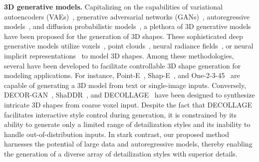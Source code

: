 \noindent\textbf{3D generative models.}
Capitalizing on the capabilities of variational autoencoders (VAEs)~\cite{vae,vqvae}, generative adversarial networks (GANs)~\cite{gan}, autoregressive models~\cite{pixelcnn,pixelcnnplus}, and diffusion probabilistic models~\cite{diffusion,DBLP:conf/icml/Sohl-DicksteinW15,DBLP:conf/iclr/0011SKKEP21}, a plethora of 3D generative models have been proposed for the generation of 3D shapes. These sophisticated deep generative models utilize voxels~\cite{DBLP:conf/nips/0001ZXFT16,DBLP:conf/eccv/ChoyXGCS16,xcube,DBLP:conf/3dim/HaneTM17}, point clouds~\cite{DBLP:conf/icml/AchlioptasDMG18,DBLP:conf/nips/zengVWGLFK22,craftsman,DBLP:conf/cvpr/FanSG17,DBLP:journals/tog/YinCHCZ19}, neural radiance fields~\cite{DreamFusion,magic3d,nerf,dreamgaussian,LGM,LRM}, or neural implicit representations~\cite{DBLP:conf/cvpr/GroueixFKRA18,pixel2mesh,DBLP:conf/iclr/ZhangCLGZ0F21,diffsdf,DBLP:conf/siggrapha/HuiLHF22,get3d,fantasia3d,neusdfusion,DBLP:conf/cvpr/ChenZ19,occnetwork,deepsdf,3dshape2vecset} to model 3D shapes. Among these methodologies, several have been developed to facilitate controllable 3D shape generation for modeling applications. For instance, Point-E~\cite{pointe}, Shap-E~\cite{shape}, and One-2-3-45~\cite{one2345} are capable of generating a 3D model from text or single-image inputs. Conversely, DECOR-GAN~\cite{decorgan}, ShaDDR~\cite{shaddr}, and DECOLLAGE~\cite{DECOLLAGE} have been designed to synthesize intricate 3D shapes from coarse voxel input. Despite the fact that DECOLLAGE~\cite{DECOLLAGE} facilitates interactive style control during generation, it is constrained by its ability to generate only a limited range of detailization styles and its inability to handle out-of-distribution inputs. In stark contrast, our proposed method harnesses the potential of large data and autoregressive models, thereby enabling the generation of a diverse array of detailization styles with superior details.

